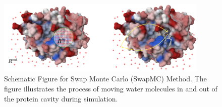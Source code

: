 \documentclass[journal=jacsat,manuscript=article]{achemso}
\begin{document}
\begin{figure}
  \includegraphics[width=0.9\textwidth]{figures/SwapMonteCarlo-scheme.png}
  \caption{Schematic Figure for Swap Monte Carlo (SwapMC) Method.
  The figure illustrates the process of moving water molecules in and out of the protein cavity during simulation.}
  \label{fig:scheme}
\end{figure}
\end{document}
